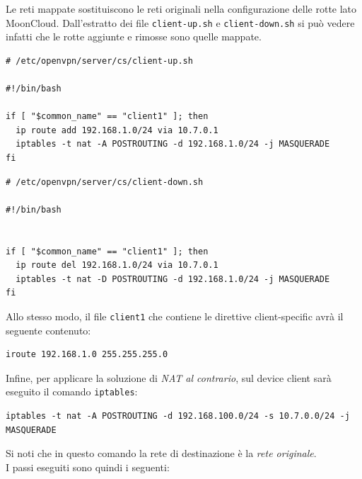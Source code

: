 Le reti mappate sostituiscono le reti originali nella configurazione delle rotte lato
MoonCloud. Dall'estratto dei file \texttt{client-up.sh} e
\texttt{client-down.sh} si può vedere infatti che le rotte aggiunte e rimosse sono
quelle mappate.
\begin{verbatim}
# /etc/openvpn/server/cs/client-up.sh

#!/bin/bash

if [ "$common_name" == "client1" ]; then
  ip route add 192.168.1.0/24 via 10.7.0.1
  iptables -t nat -A POSTROUTING -d 192.168.1.0/24 -j MASQUERADE
fi
\end{verbatim}
\begin{verbatim}
# /etc/openvpn/server/cs/client-down.sh

#!/bin/bash


if [ "$common_name" == "client1" ]; then
  ip route del 192.168.1.0/24 via 10.7.0.1
  iptables -t nat -D POSTROUTING -d 192.168.1.0/24 -j MASQUERADE
fi
\end{verbatim}
Allo stesso modo, il file \texttt{client1} che contiene le direttive client-specific
avrà il seguente contenuto:
\begin{verbatim}
iroute 192.168.1.0 255.255.255.0
\end{verbatim}
Infine, per applicare la soluzione di \textit{NAT al contrario}, sul device client
sarà eseguito il comando \texttt{iptables}:
\begin{verbatim}
iptables -t nat -A POSTROUTING -d 192.168.100.0/24 -s 10.7.0.0/24 -j MASQUERADE
\end{verbatim}
Si noti che in questo comando la rete di destinazione è la \textit{rete originale}.\\
 I passi eseguiti sono quindi i seguenti:
